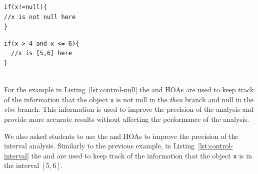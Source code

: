 \begin{minipage}{0.45\textwidth}
  \begin{lstlisting}[language=JastAdd,caption={Control-sensitivity to improve null pointer analysis.}, label={lst:control-null}]
if(x!=null){
//x is not null here
}
  \end{lstlisting}
  \end{minipage}\hfill%
  \begin{minipage}{0.45\textwidth}
  \begin{lstlisting}[language=JastAdd,caption={Control-sensitivity to improve interval analysis.}, label={lst:control-interval}]
if(x > 4 and x <= 6){
  //x is [5,6] here
}
  \end{lstlisting}
\end{minipage}\\
For the example in Listing~\ref{lst:control-null} the  and 
HOAs are used to keep track of the information that the object \texttt{x} is not null
in the \emph{then} branch and null in the \emph{else} branch.
This information is used to improve the precision of the analysis and provide
more accurate results without affecting the performance of the analysis.

We also asked students to use the  and 
HOAs to improve the precision of the interval analysis. Similarly to the previous example, in 
Listing~\ref{lst:control-interval} the  and 
are used to keep track of the information that the object \texttt{x} is in the interval $[5,6]$.


